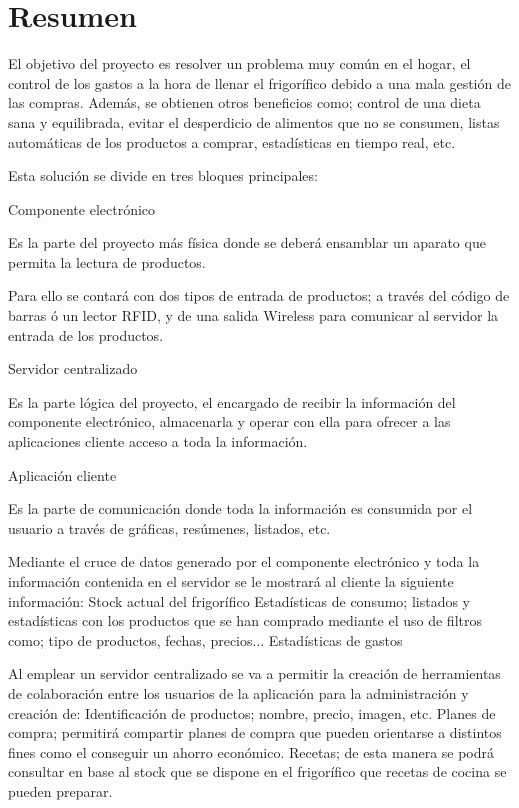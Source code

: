 \chapter*{Resumen}

El objetivo del proyecto es resolver un problema muy común en el hogar, el control de los gastos a la hora de llenar el frigorífico debido a una mala gestión de las compras. Además, se obtienen otros beneficios como; control de una dieta sana y equilibrada, evitar el desperdicio de alimentos que no se consumen, listas automáticas de los productos a comprar, estadísticas en tiempo real, etc.

Esta solución se divide en tres bloques principales:

 \begin{description}
    \item Componente electrónico

    Es la parte del proyecto más física donde se deberá ensamblar un aparato que permita la lectura de productos.

    Para ello se contará con dos tipos de entrada de productos; a través del código de barras ó un lector RFID, y de una salida Wireless para comunicar al servidor la entrada de los productos.

    \item Servidor centralizado

    Es la parte lógica del proyecto, el encargado de recibir la información del componente electrónico, almacenarla y operar con ella para ofrecer a las aplicaciones cliente acceso a toda la información.

    \item Aplicación cliente

    Es la parte de comunicación donde toda la información es consumida por el usuario a través de gráficas, resúmenes, listados, etc.

    Mediante el cruce de datos generado por el componente electrónico y toda la información contenida en el servidor se le mostrará al cliente la siguiente información:
        Stock actual del frigorífico
        Estadísticas de consumo; listados y estadísticas con los productos que se han comprado mediante el uso de filtros como; tipo de productos, fechas, precios...
        Estadísticas de gastos

    Al emplear un servidor centralizado se va a permitir la creación de herramientas de colaboración entre los usuarios de la aplicación para la administración y creación de:
        Identificación de productos; nombre, precio, imagen, etc.
        Planes de compra; permitirá compartir planes de compra que pueden orientarse a distintos fines como el conseguir un ahorro económico.
        Recetas; de esta manera se podrá consultar en base al stock que se dispone en el frigorífico que recetas de cocina se pueden preparar.
\end{description}